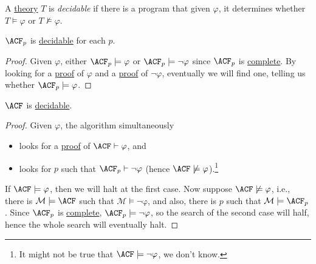 \begin{definition}[Decidable]\label{def:decidable}
	A \hyperref[def:theory]{theory} \(T\) is \emph{decidable} if there is a program that given \(\varphi \), it determines whether \(T \models \varphi \) or \(T \not \models \varphi \).
\end{definition}

\begin{corollary}\label{col:ACF-p-decidable}
	\(\ACF_p \) is \hyperref[def:decidable]{decidable} for each \(p\).
\end{corollary}
\begin{proof}
	Given \(\varphi \), either \(\ACF_p \models \varphi \) or \(\ACF_p \models \lnot \varphi \) since \(\ACF_p \) is \hyperref[def:theory-complete]{complete}. By looking for a \hyperref[def:proof]{proof} of \(\varphi \) and a \hyperref[def:proof]{proof} of \(\lnot \varphi \), eventually we will find one, telling us whether \(\ACF_p \models \varphi \).
\end{proof}

\begin{corollary}\label{col:ACF-decidable}
	\(\ACF \) is \hyperref[def:decidable]{decidable}.
\end{corollary}
\begin{proof}
	Given \(\varphi \), the algorithm simultaneously
	\begin{itemize}
		\item looks for a \hyperref[def:proof]{proof} of \(\ACF \vdash \varphi \), and
		\item looks for \(p\) such that \(\ACF_p \vdash \lnot \varphi \) (hence \(\ACF \not \models \varphi \)).\footnote{It might not be true that \(\ACF \models \lnot \varphi \), we don't know.}
	\end{itemize}
	If \(\ACF \models \varphi \), then we will halt at the first case. Now suppose \(\ACF \not \models \varphi \), i.e., there is \(\mathcal{M} \models \ACF\) such that \(\mathrm{\mathcal{M} \models \lnot \varphi } \), and also, there is \(p\) such that \(\mathcal{M} \models \ACF_p\). Since \(\ACF_p\) is \hyperref[def:theory-complete]{complete}, \(\ACF_p \models \lnot \varphi \), so the search of the second case will half, hence the whole search will eventually halt.
\end{proof}